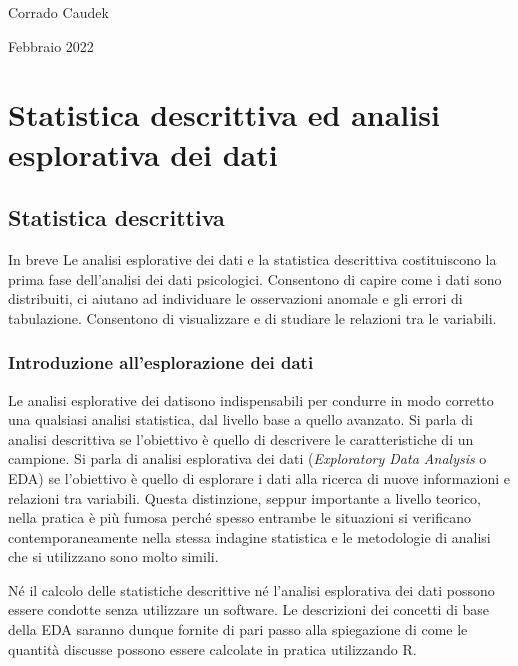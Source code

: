 \documentclass[
  10pt,
  italian,
  a4paper,
  extrafontsizes,onecolumn,openright
  ]{memoir}
\newenvironment{Summary}
  {\begin{bclogo}[logo=\bctrombone, noborder=true, couleur=lightgray!50]{In breve}\parindent0pt}
  {\end{bclogo}}
\theoremstyle{definition}
\theoremstyle{definition}
\theoremstyle{definition}
\theoremstyle{definition}
\theoremstyle{remark}
\begin{document}
\bigskip

Corrado Caudek

\bigskip

Febbraio 2022

\mainmatter

\hypertarget{part-statistica-descrittiva-ed-analisi-esplorativa-dei-dati}{%
\part*{Statistica descrittiva ed analisi esplorativa dei dati}\label{part-statistica-descrittiva-ed-analisi-esplorativa-dei-dati}}

\hypertarget{descriptive-stats}{%
\chapter{Statistica descrittiva}\label{descriptive-stats}}

\begin{Summary}
Le analisi esplorative dei dati e la statistica descrittiva
costituiscono la prima fase dell'analisi dei dati psicologici.
Consentono di capire come i dati sono distribuiti, ci aiutano ad
individuare le osservazioni anomale e gli errori di tabulazione.
Consentono di visualizzare e di studiare le relazioni tra le variabili.
\end{Summary}

\hypertarget{chapter-descript}{%
\section{Introduzione all'esplorazione dei dati}\label{chapter-descript}}

Le analisi esplorative dei datisono indispensabili per condurre in modo corretto una qualsiasi analisi statistica, dal livello base a quello avanzato. Si parla di analisi descrittiva se l'obiettivo è quello di descrivere le caratteristiche di un campione. Si parla di analisi esplorativa dei dati (\emph{Exploratory Data Analysis} o EDA) se l'obiettivo è quello di esplorare i dati alla ricerca di nuove informazioni e relazioni tra variabili. Questa distinzione, seppur importante a livello teorico, nella pratica è più fumosa perché spesso entrambe le situazioni si verificano contemporaneamente nella stessa indagine statistica e le metodologie di analisi che si utilizzano sono molto simili.

Né il calcolo delle statistiche descrittive né l'analisi esplorativa dei dati possono essere condotte senza utilizzare un software. Le descrizioni dei concetti di base della EDA saranno dunque fornite di pari passo alla spiegazione di come le quantità discusse possono essere calcolate in pratica utilizzando R.
\end{document}
